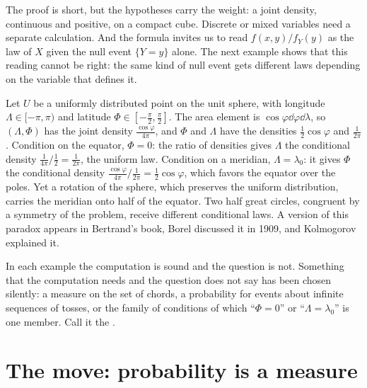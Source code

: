 \begin{refsection}
The proof is short, but the hypotheses carry the weight: a joint density, continuous and positive, on a compact cube. Discrete or mixed variables need a separate calculation. And the formula invites us to read $f(x,y)/f_Y(y)$ as the law of $X$ given the null event $\{Y=y\}$ alone. The next example shows that this reading cannot be right: the same kind of null event gets different laws depending on the variable that defines it.

Let $U$ be a uniformly distributed point on the unit sphere, with longitude $\Lambda\in[-\pi,\pi)$ and latitude $\Phi\in[-\frac\pi2,\frac\pi2]$. The area element is $\cos\varphi\dd\varphi\dd\lambda$, so $(\Lambda,\Phi)$ has the joint density $\frac{\cos\varphi}{4\pi}$, and $\Phi$ and $\Lambda$ have the densities $\frac12\cos\varphi$ and $\frac1{2\pi}$. Condition on the equator, $\Phi=0$: the ratio of densities gives $\Lambda$ the conditional density $\frac{1}{4\pi}\big/\frac12=\frac1{2\pi}$, the uniform law. Condition on a meridian, $\Lambda=\lambda_0$: it gives $\Phi$ the conditional density $\frac{\cos\varphi}{4\pi}\big/\frac1{2\pi}=\frac12\cos\varphi$, which favors the equator over the poles. Yet a rotation of the sphere, which preserves the uniform distribution, carries the meridian onto half of the equator. Two half great circles, congruent by a symmetry of the problem, receive different conditional laws. A version of this paradox appears in Bertrand's book, Borel discussed it in 1909, and Kolmogorov explained it.

In each example the computation is sound and the question is not. Something that the computation needs and the question does not say has been chosen silently: a measure on the set of chords, a probability for events about infinite sequences of tosses, or the family of conditions of which ``$\Phi=0$'' or ``$\Lambda=\lambda_0$'' is one member. Call it the .

\section{The move: probability is a measure}\label{sec:kolmogorov:move}


\end{refsection}
